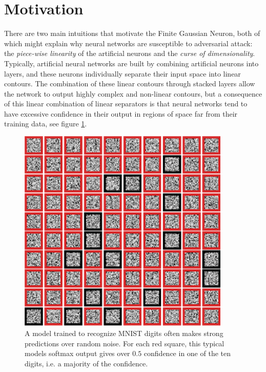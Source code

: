 \documentclass[12pt,oneside]{CUNY_PhD}
\begin{document}
\section{Motivation}
There are two main intuitions that motivate the Finite Gaussian Neuron, both of which might explain why neural networks are susceptible to adversarial attack: the \emph{piece-wise linearity} of the artificial neurons and the \emph{curse of dimensionality}.\\
Typically, artificial neural networks are built by combining artificial neurons into layers, and these neurons individually separate their input space into linear contours. The combination of these linear contours through stacked layers allow the network to output highly complex and non-linear contours, but a consequence of this linear combination of linear separators is that neural networks tend to have excessive confidence in their output in regions of space far from their training data, see figure \ref{fig:mot-pred-noise}.
\begin{figure}[!htbp]
    \centering
    \includegraphics[width=0.9\textwidth]{images/Motivation/pred_noise.png}
    \caption{A model trained to recognize MNIST digits often makes strong predictions over random noise. For each red square, this typical models softmax output gives over $0.5$ confidence in one of the ten digits, i.e. a majority of the confidence.}
    \label{fig:mot-pred-noise}
\end{figure}\\
\end{document}
